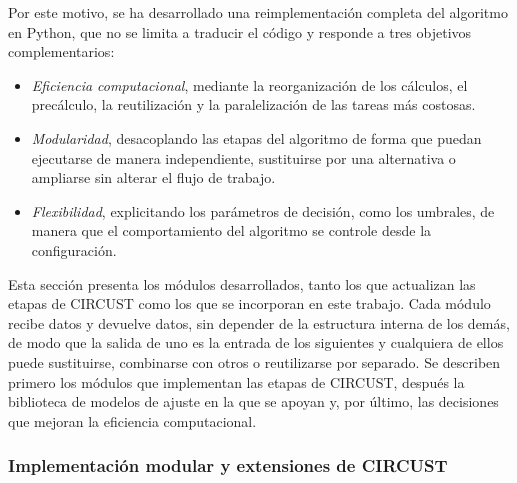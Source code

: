 \documentclass[12pt, a4paper]{report}
\begin{document}
Por este motivo, se ha desarrollado una reimplementación completa del algoritmo en Python, que no se limita a traducir el código y responde a tres objetivos complementarios:

\begin{itemize}
\item \textit{Eficiencia computacional}, mediante la reorganización de los cálculos, el precálculo, la reutilización y la paralelización de las tareas más costosas.
\item \textit{Modularidad}, desacoplando las etapas del algoritmo de forma que puedan ejecutarse de manera independiente, sustituirse por una alternativa o ampliarse sin alterar el flujo de trabajo.
\item \textit{Flexibilidad}, explicitando los parámetros de decisión, como los umbrales, de manera que el comportamiento del algoritmo se controle desde la configuración.
\end{itemize}

Esta sección presenta los módulos desarrollados, tanto los que actualizan las etapas de CIRCUST como los que se incorporan en este trabajo. Cada módulo recibe datos y devuelve datos, sin depender de la estructura interna de los demás, de modo que la salida de uno es la entrada de los siguientes y cualquiera de ellos puede sustituirse, combinarse con otros o reutilizarse por separado. Se describen primero los módulos que implementan las etapas de CIRCUST, después la biblioteca de modelos de ajuste en la que se apoyan y, por último, las decisiones que mejoran la eficiencia computacional.

\subsubsection{Implementación modular y extensiones de CIRCUST}
\label{sec:modulos}
\end{document}
